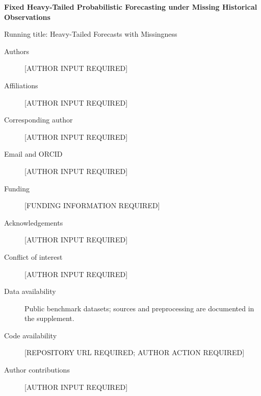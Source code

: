 \documentclass[11pt]{article}
\begin{document}
\begin{center}
{\Large\bfseries Fixed Heavy-Tailed Probabilistic Forecasting under Missing Historical Observations\par}
\vspace{0.5em}
{\small Running title: Heavy-Tailed Forecasts with Missingness\par}
\end{center}
\begin{description}
\item[Authors] [AUTHOR INPUT REQUIRED]
\item[Affiliations] [AUTHOR INPUT REQUIRED]
\item[Corresponding author] [AUTHOR INPUT REQUIRED]
\item[Email and ORCID] [AUTHOR INPUT REQUIRED]
\item[Funding] [FUNDING INFORMATION REQUIRED]
\item[Acknowledgements] [AUTHOR INPUT REQUIRED]
\item[Conflict of interest] [AUTHOR INPUT REQUIRED]
\item[Data availability] Public benchmark datasets; sources and preprocessing are documented in the supplement.
\item[Code availability] [REPOSITORY URL REQUIRED; AUTHOR ACTION REQUIRED]
\item[Author contributions] [AUTHOR INPUT REQUIRED]
\end{description}
\end{document}
